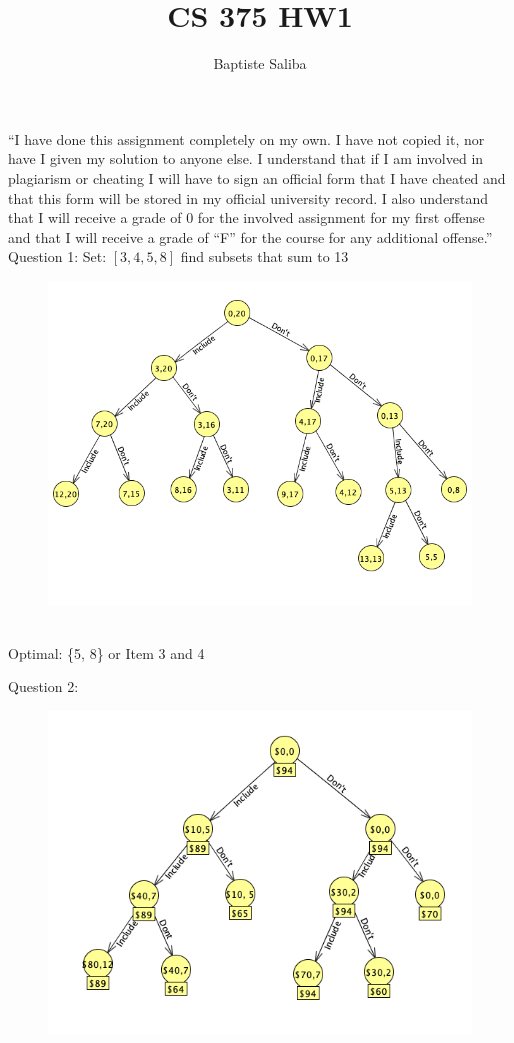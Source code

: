 \documentclass[12pt]{article}
\title{CS 375 HW1}
\author{Baptiste Saliba}
\begin{document}
\large
\maketitle

“I have done this assignment completely on my own. I have not copied it, nor have I given my solution to anyone else. I understand that if I am involved in plagiarism or cheating I will have to sign an official form that I have cheated and that this form will be stored in my official university record. I also understand that I will receive a grade of 0 for the involved assignment for my first offense and that I will receive a grade of “F” for the course for any additional offense.”\\

\pagebreak
Question 1:
Set: $[3,4,5,8] $ find subsets that sum to 13\\
\begin{figure}[ht]
  \includegraphics[width=\linewidth]{Q1.png}
\end{figure}\\
Optimal: \{5, 8\} or Item 3 and 4\\ 

\pagebreak

Question 2: 
\begin{figure}[ht]
  \includegraphics[width=\linewidth]{Q2.png}
\end{figure}
\end{document}
